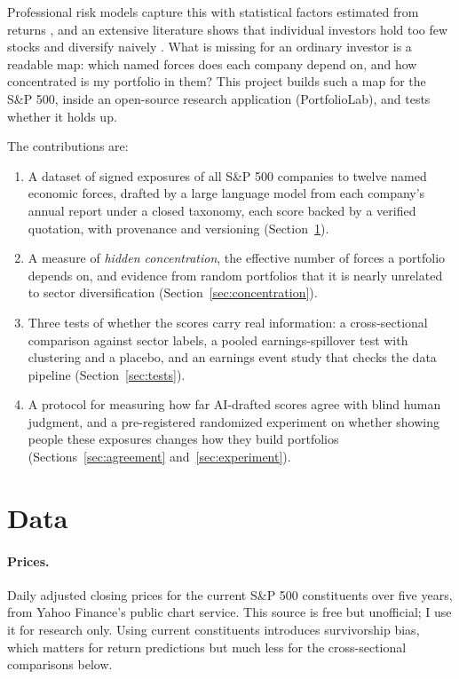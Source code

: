 \documentclass[11pt]{article}
\begin{document}
Professional risk models capture this with statistical factors estimated from returns \citep{rosenberg1974, famafrench1993}, and an extensive literature shows that individual investors hold too few stocks and diversify naively \citep{benartzi2001, goetzmann2008}. What is missing for an ordinary investor is a readable map: which named forces does each company depend on, and how concentrated is my portfolio in them? This project builds such a map for the S\&P 500, inside an open-source research application (PortfolioLab), and tests whether it holds up.

The contributions are:
\begin{enumerate}
  \item A dataset of signed exposures of all \nProfiled{} S\&P 500 companies to twelve named economic forces, drafted by a large language model from each company's annual report under a closed taxonomy, each score backed by a verified quotation, with provenance and versioning (Section~\ref{sec:data}).
  \item A measure of \emph{hidden concentration}, the effective number of forces a portfolio depends on, and evidence from random portfolios that it is nearly unrelated to sector diversification (Section~\ref{sec:concentration}).
  \item Three tests of whether the scores carry real information: a cross-sectional comparison against sector labels, a pooled earnings-spillover test with clustering and a placebo, and an earnings event study that checks the data pipeline (Section~\ref{sec:tests}).
  \item A protocol for measuring how far AI-drafted scores agree with blind human judgment, and a pre-registered randomized experiment on whether showing people these exposures changes how they build portfolios (Sections~\ref{sec:agreement} and~\ref{sec:experiment}).
\end{enumerate}

\section{Data}\label{sec:data}

\paragraph{Prices.} Daily adjusted closing prices for the \nCompanies{} current S\&P 500 constituents over five years, from Yahoo Finance's public chart service. This source is free but unofficial; I use it for research only. Using current constituents introduces survivorship bias, which matters for return predictions but much less for the cross-sectional comparisons below.
\end{document}
